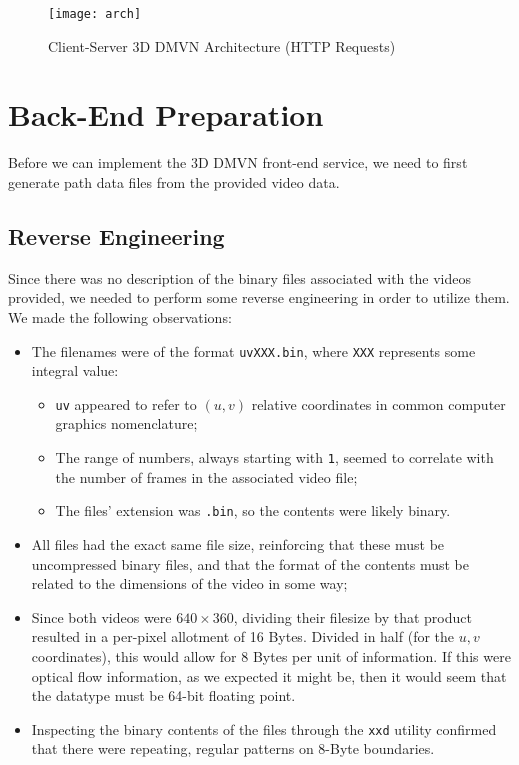 \begin{figure}[h]
\centering
\texttt{[image: arch]}
\caption{Client-Server 3D DMVN Architecture (HTTP Requests)}
\end{figure}

\section{Back-End Preparation}
Before we can implement the 3D DMVN front-end service, we need to first generate path data files from the provided video data.

\subsection{Reverse Engineering}
Since there was no description of the binary files associated with the videos provided, we needed to perform some reverse engineering in order to utilize them. We made the following observations:
\begin{itemize}
    \item The filenames were of the format \texttt{uvXXX.bin}, where \texttt{XXX} represents some integral value:
    \begin{itemize}
        \item \texttt{uv} appeared to refer to $(u,v)$ relative coordinates in common computer graphics nomenclature;
        \item The range of numbers, always starting with \texttt{1}, seemed to correlate with the number of frames in the associated video file;
        \item The files' extension was \texttt{.bin}, so the contents were likely binary.
    \end{itemize}
    \item All files had the exact same file size, reinforcing that these must be uncompressed binary files, and that the format of the contents must be related to the dimensions of the video in some way;
    \item Since both videos were $640\times 360$, dividing their filesize by that product resulted in a per-pixel allotment of 16 Bytes. Divided in half (for the ${u,v}$ coordinates), this would allow for 8 Bytes per unit of information. If this were optical flow information, as we expected it might be, then it would seem that the datatype must be 64-bit floating point.
    \item Inspecting the binary contents of the files through the \texttt{xxd} utility confirmed that there were repeating, regular patterns on 8-Byte boundaries.
\end{itemize}\par

